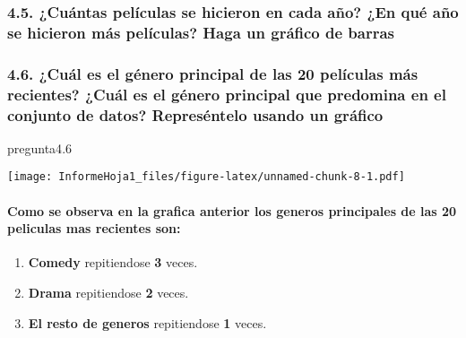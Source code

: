 \documentclass[
]{article}
\newenvironment{Shaded}{\begin{snugshade}}{\end{snugshade}}
\newcommand{\FloatTok}[1]{\textcolor[rgb]{0.00,0.00,0.81}{#1}}
\newcommand{\NormalTok}[1]{#1}
\providecommand{\tightlist}{%
  \setlength{\itemsep}{0pt}\setlength{\parskip}{0pt}}
\begin{document}
\hypertarget{cuuxe1ntas-peluxedculas-se-hicieron-en-cada-auxf1o-en-quuxe9-auxf1o-se-hicieron-muxe1s-peluxedculas-haga-un-gruxe1fico-de-barras}{%
\subsubsection{4.5. ¿Cuántas películas se hicieron en cada año? ¿En qué
año se hicieron más películas? Haga un gráfico de
barras}\label{cuuxe1ntas-peluxedculas-se-hicieron-en-cada-auxf1o-en-quuxe9-auxf1o-se-hicieron-muxe1s-peluxedculas-haga-un-gruxe1fico-de-barras}}

\hypertarget{cuuxe1l-es-el-guxe9nero-principal-de-las-20-peluxedculas-muxe1s-recientes-cuuxe1l-es-el-guxe9nero-principal-que-predomina-en-el-conjunto-de-datos-represuxe9ntelo-usando-un-gruxe1fico}{%
\subsubsection{4.6. ¿Cuál es el género principal de las 20 películas más
recientes? ¿Cuál es el género principal que predomina en el conjunto de
datos? Represéntelo usando un
gráfico}\label{cuuxe1l-es-el-guxe9nero-principal-de-las-20-peluxedculas-muxe1s-recientes-cuuxe1l-es-el-guxe9nero-principal-que-predomina-en-el-conjunto-de-datos-represuxe9ntelo-usando-un-gruxe1fico}}

\begin{Shaded}
\begin{Highlighting}[]
\NormalTok{pregunta4}\FloatTok{.6}
\end{Highlighting}
\end{Shaded}

\texttt{[image: InformeHoja1\_files/figure-latex/unnamed-chunk-8-1.pdf]}

\hypertarget{como-se-observa-en-la-grafica-anterior-los-generos-principales-de-las-20-peliculas-mas-recientes-son}{%
\paragraph{Como se observa en la grafica anterior los generos
principales de las 20 peliculas mas recientes
son:}\label{como-se-observa-en-la-grafica-anterior-los-generos-principales-de-las-20-peliculas-mas-recientes-son}}

\begin{enumerate}
\def\labelenumi{\arabic{enumi}.}
\tightlist
\item
  \textbf{Comedy} repitiendose \textbf{3} veces.
\item
  \textbf{Drama} repitiendose \textbf{2} veces.
\item
  \textbf{El resto de generos} repitiendose \textbf{1} veces.
\end{enumerate}
\end{document}
